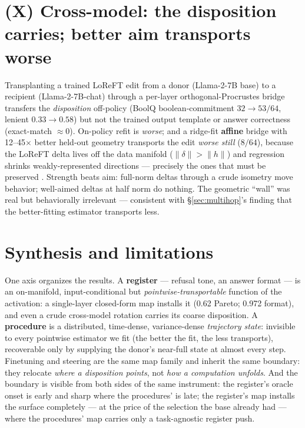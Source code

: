 \documentclass{article}
\begin{document}
\section{(X) Cross-model: the disposition carries; better aim transports worse}
\label{sec:crossmodel}

Transplanting a trained LoReFT edit from a donor (Llama-2-7B base) to a recipient (Llama-2-7B-chat)
through a per-layer orthogonal-Procrustes bridge transfers the \emph{disposition} off-policy (BoolQ
boolean-commitment $32 \to 53/64$, lenient $0.33 \to 0.58$) but not the trained output template or
answer correctness (exact-match ${\approx}0$). On-policy refit is \emph{worse}; and a ridge-fit
\textbf{affine} bridge with 12--45$\times$ better held-out geometry transports the edit \emph{worse
still} ($8/64$), because the LoReFT delta lives off the data manifold
($\lVert\delta\rVert > \lVert h\rVert$) and regression shrinks weakly-represented directions ---
precisely the ones that must be preserved \citep{oozeer2025transfer}. Strength beats aim: full-norm
deltas through a crude isometry move behavior; well-aimed deltas at half norm do nothing. The
geometric ``wall'' was real but behaviorally irrelevant --- consistent with \S\ref{sec:multihop}'s
finding that the better-fitting estimator transports less.

\section{Synthesis and limitations}
\label{sec:synthesis}

One axis organizes the results. A \textbf{register} --- refusal tone, an answer format --- is an
on-manifold, input-conditional but \emph{pointwise-transportable} function of the activation: a
single-layer closed-form map installs it (0.62 Pareto; 0.972 format), and even a crude cross-model
rotation carries its coarse disposition. A \textbf{procedure} is a distributed, time-dense,
variance-dense \emph{trajectory state}: invisible to every pointwise estimator we fit (the better
the fit, the less transports), recoverable only by supplying the donor's near-full state at almost
every step. Finetuning and steering are the same map family and inherit the same boundary: they
relocate \emph{where a disposition points}, not \emph{how a computation unfolds}. And the boundary
is visible from both sides of the same instrument: the register's oracle onset is early and sharp
where the procedures' is late; the register's map installs the surface completely --- at the price
of the selection the base already had --- where the procedures' map carries only a task-agnostic
register push.
\end{document}
